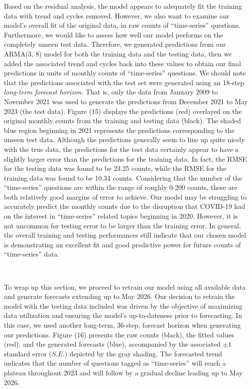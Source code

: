 \documentclass[10pt]{article}
\begin{document}
Based on the residual analysis, the model appears to adequately fit the training data with trend and cycles removed. However, we also want to examine our model's overall fit of the original data, in raw counts of ``time-series'' questions. Furthermore, we would like to assess how well our model performs on the completely unseen test data. Therefore, we generated predictions from our ARMA(3, 8) model for both the training data and the testing data, then we added the associated trend and cycles back into these values to obtain our final predictions in units of monthly counts of ``time-series'' questions. We should note that the predictions associated with the test set were generated using an 18-step \textit{long-term forecast horizon}. That is, only the data from January 2009 to November 2021 was used to generate the predictions from December 2021 to May 2023 (the test data). Figure (15) displays the predictions (red) overlayed on the original monthly counts from the training and testing data (black). The shaded blue region beginning in 2021 represents the predictions corresponding to the unseen test data. Although the predictions generally seem to line up quite nicely with the true data, the predictions for the test data certainly appear to have a slightly larger error than the predictions for the training data. In fact, the RMSE for the testing data was found to be 23.25 counts, while the RMSE for the training data was found to be 10.34 counts. Considering that the number of the ``time-series'' questions are within the range of roughly 0-200 counts, these are both relatively good margins of error to achieve. Our model may be struggling to accurately predict the monthly counts due to the disruption that COVID-19 had on the interest in ``time-series'' related topics beginning in 2020. However, it is not uncommon for testing error to be larger than the training error. In general, the overall training and testing performances still indicate that our chosen model is demonstrating an excellent fit and good predictive power for future counts of ``time-series'' data.

\

To wrap up this section, we proceed to retrain our model using all available data and generate forecasts extending up to May 2026. Our decision to retrain the model with the testing data included was driven by the objective of maximizing data utilization and ensuring the model's up-to-dateness prior to forecasting. In this case, we used another long-term, 36-step, forecast horizon when generating our predictions. Figure (16) presents the raw counts (black), the fitted values (red), and the generated forecasts (blue), accompanied by the associated $\pm1$ standard error ($S.E.$) depicted by the gray shading. The forecasted trend indicates that the number of questions tagged as ``time-series'' will reach a plateau throughout 2023 and will follow by a gradual decline leading up to May 2026.
\end{document}
